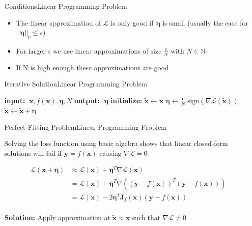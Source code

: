 \documentclass[xcolor={cmyk}]{beamer}
\newcommand{\mcl}{\mathcal}
\newcommand{\bm}{\boldsymbol}
\begin{document}
\begin{frame}{Conditions}{Linear Programming Problem}

	\begin{itemize}
		\item The linear approximation of $\mcl{L}$ is only good if $\bm{\eta}$ is small (usually the case for $\lvert\lvert \bm{\eta} \rvert\rvert_p \leq \epsilon$)
		\item For larger $\epsilon$ we use linear approximations of size $\frac{\epsilon}{N}$ with $N \in \mathbb{N}$
		\item If N is high enough these approximations are good
	\end{itemize}

\end{frame}




\begin{frame}{Iterative Solution}{Linear Programming Problem}

	\begin{algorithm}[H]
	\caption{Iterative Solution for $p = \infty$}
	\begin{algorithmic}[1]
	\STATE \textbf{input:} $\; \bm{x}, f(\bm{x}), \bm{\eta}, N$
	\STATE \textbf{output:} $\; \bm{\eta}$
	\STATE \textbf{initialize:} $\bm{\tilde{x}} \gets \bm{x}$
		\STATE $ \bm{\eta} \gets \frac{\bm{\epsilon}}{N} \; \text{sign}(\nabla \mcl{L}(\bm{\tilde{x}})) $
		\STATE $ \bm{\tilde{x}} \gets \bm{\tilde{x}} + \bm{\eta} $
	\ENDFOR
	\end{algorithmic}
	\end{algorithm}

\end{frame}


\begin{frame}{Perfect Fitting Problem}{Linear Programming Problem}

Solving the loss function using basic algebra shows that linear closed-form solutions
will fail if $\bm{y} = f(\bm{x})$ causing $\nabla \mcl{L} = 0$

	\begin{equation*}
	\begin{aligned}
		\mcl{L}(\bm{x} + \bm{\eta}) &\approx \mcl{L}(\bm{x}) + \bm{\eta}^T \nabla \mcl{L}(\bm{x}) \\[10pt]
			&= \mcl{L}(\bm{x}) + \bm{\eta}^T \nabla( (\bm{y} - f(\bm{x}))^T (\bm{y} - f(\bm{x})) ) \\[10pt]
			&= \mcl{L}(\bm{x}) - 2 \bm{\eta}^T \bm{J}_f(\bm{x}) ( \bm{y} - f(\bm{x}) ) \\[10pt]
	\end{aligned}
	\label{taylorlinear}
	\end{equation*}

\textbf{Solution:} Apply approximation at $\tilde{\bm{x}} \approx \bm{x}$ such that $\nabla \mcl{L} \neq 0$

\end{frame}
\end{document}
